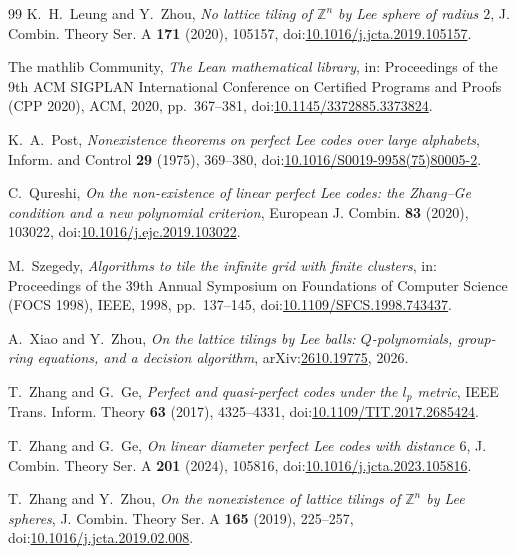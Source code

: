 \documentclass{amsart}
\theoremstyle{definition}
\theoremstyle{remark}
\numberwithin{equation}{section}
\begin{document}
\begin{thebibliography}{99}
K.~H.~Leung and Y.~Zhou, \emph{No lattice tiling of $\mathbb{Z}^n$ by Lee sphere of radius $2$}, J. Combin. Theory Ser. A \textbf{171} (2020), 105157, doi:\href{https://doi.org/10.1016/j.jcta.2019.105157}{10.1016/j.jcta.2019.105157}.

The mathlib Community, \emph{The Lean mathematical library}, in: Proceedings of the 9th ACM SIGPLAN International Conference on Certified Programs and Proofs (CPP 2020), ACM, 2020, pp.~367--381, doi:\href{https://doi.org/10.1145/3372885.3373824}{10.1145/3372885.3373824}.

K.~A.~Post, \emph{Nonexistence theorems on perfect Lee codes over large alphabets}, Inform. and Control \textbf{29} (1975), 369--380, doi:\href{https://doi.org/10.1016/S0019-9958(75)80005-2}{10.1016/S0019-9958(75)80005-2}.

C.~Qureshi, \emph{On the non-existence of linear perfect Lee codes: the Zhang--Ge condition and a new polynomial criterion}, European J. Combin. \textbf{83} (2020), 103022, doi:\href{https://doi.org/10.1016/j.ejc.2019.103022}{10.1016/j.ejc.2019.103022}.

M.~Szegedy, \emph{Algorithms to tile the infinite grid with finite clusters}, in: Proceedings of the 39th Annual Symposium on Foundations of Computer Science (FOCS 1998), IEEE, 1998, pp.~137--145, doi:\href{https://doi.org/10.1109/SFCS.1998.743437}{10.1109/SFCS.1998.743437}.

A.~Xiao and Y.~Zhou, \emph{On the lattice tilings by Lee balls: $Q$-polynomials, group-ring equations, and a decision algorithm}, arXiv:\href{https://arxiv.org/abs/2610.19775}{2610.19775}, 2026.

T.~Zhang and G.~Ge, \emph{Perfect and quasi-perfect codes under the $l_p$ metric}, IEEE Trans. Inform. Theory \textbf{63} (2017), 4325--4331, doi:\href{https://doi.org/10.1109/TIT.2017.2685424}{10.1109/TIT.2017.2685424}.

T.~Zhang and G.~Ge, \emph{On linear diameter perfect Lee codes with distance $6$}, J. Combin. Theory Ser. A \textbf{201} (2024), 105816, doi:\href{https://doi.org/10.1016/j.jcta.2023.105816}{10.1016/j.jcta.2023.105816}.

T.~Zhang and Y.~Zhou, \emph{On the nonexistence of lattice tilings of $\mathbb{Z}^n$ by Lee spheres}, J. Combin. Theory Ser. A \textbf{165} (2019), 225--257, doi:\href{https://doi.org/10.1016/j.jcta.2019.02.008}{10.1016/j.jcta.2019.02.008}.

\end{thebibliography}
\end{document}
